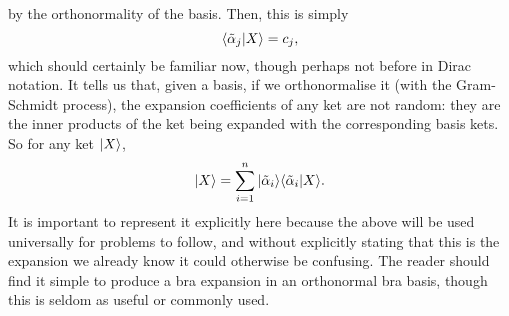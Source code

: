by the orthonormality of the basis. Then, this is simply
$$
\langle\tilde{\alpha}_{j}|X\rangle=c_{j},
$$
which should certainly be familiar now, though perhaps not before in Dirac notation. It tells us that, given a basis, if we orthonormalise it (with the Gram-Schmidt process), the expansion coefficients of any ket are not random: they are the inner products of the ket being expanded with the corresponding basis kets. So for any ket $|X\rangle$,
$$
|X\rangle=\sum_{i=1}^{n}|\tilde{\alpha}_{i}\rangle\langle\tilde{\alpha}_{i}|X\rangle.
$$
It is important to represent it explicitly here because the above will be used universally for problems to follow, and without explicitly stating that this is the expansion we already know it could otherwise be confusing. The reader should find it simple to produce a bra expansion in an orthonormal bra basis, though this is seldom as useful or commonly used.
